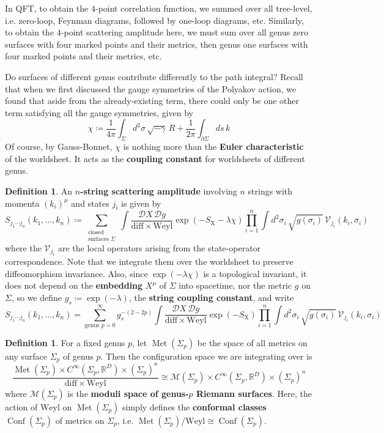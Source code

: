 \documentclass{report}
\theoremstyle{plain}
\theoremstyle{definition}
\newtheorem{definition}[theorem]{Definition}
\theoremstyle{remark}
\newcommand{\di}{\partial}
\newcommand{\bR}{\mathbb{R}}
\newcommand{\cD}{\mathcal{D}}
\newcommand{\cM}{\mathcal{M}}
\newcommand{\cV}{\mathcal{V}}
\newcommand{\diff}{\mathrm{diff}}
\newcommand{\Weyl}{\mathrm{Weyl}}
\DeclareMathOperator{\Met}{Met}
\DeclareMathOperator{\Conf}{Conf}
\begin{document}
In QFT, to obtain the $4$-point correlation function, we summed over
all tree-level, i.e. zero-loop, Feynman diagrams, followed by one-loop
diagrams, etc. Similarly, to obtain the $4$-point scattering amplitude
here, we must sum over all genus zero surfaces with four marked points
and their metrics, then genus one surfaces with four marked points and
their metrics, etc.

Do surfaces of different genus contribute differently to the path
integral? Recall that when we first discussed the gauge symmetries of
the Polyakov action, we found that aside from the already-existing
term, there could only be one other term satisfying all the
gauge symmetries, given by
\[ \chi \coloneqq \frac{1}{4\pi} \int_\Sigma d^2\sigma \, \sqrt{-\gamma} \, R + \frac{1}{2\pi} \int_{\di \Sigma} ds \, k \]
Of course, by Gauss-Bonnet, $\chi$ is nothing more than the {\bf Euler
  characteristic} of the worldsheet. It acts as the {\bf coupling
  constant} for worldsheets of different genus.

\begin{definition}
  An {\bf $n$-string scattering amplitude} involving $n$ strings with
  momenta $(k_i)^\mu$ and states $j_i$ is given by
  \[ S_{j_1 \cdots j_n}(k_1, \ldots, k_n) \coloneqq \sum_{\substack{\text{closed}\\\text{surfaces } \Sigma}} \int \frac{\cD X \, \cD g}{\diff \times \Weyl} \exp(-S_{\text{X}} - \lambda \chi) \prod_{i=1}^n \int d^2\sigma_i \, \sqrt{g(\sigma_i)} \, \cV_{j_i}(k_i, \sigma_i) \]
  where the $\cV_{j_i}$ are the local operators arising from the
  state-operator correspondence. Note that we integrate them over the
  worldsheet to preserve diffeomorphism invariance. Also, since
  $\exp(-\lambda \chi)$ is a topological invariant, it does not depend
  on the {\bf embedding} $X^\mu$ of $\Sigma$ into spacetime, nor the
  metric $g$ on $\Sigma$, so we define $g_s \coloneqq \exp(-\lambda)$,
  the {\bf string coupling constant}, and write
  \[ S_{j_1 \cdots j_n}(k_1, \ldots, k_n) = \sum_{\text{genus } p=0}^\infty g_s^{-(2-2p)} \int \frac{\cD X \, \cD g}{\diff \times \Weyl} \exp(-S_{\text{X}}) \prod_{i=1}^n \int d^2\sigma_i \, \sqrt{g(\sigma_i)} \, \cV_{j_i}(k_i, \sigma_i) \]
\end{definition}

\begin{definition}
  For a fixed genus $p$, let $\Met(\Sigma_p)$ be the space of all
  metrics on any surface $\Sigma_p$ of genus $p$. Then the
  configuration space we are integrating over is
  \[ \frac{\Met(\Sigma_p) \times C^\infty(\Sigma_p, \bR^D) \times (\Sigma_p)^n}{\diff \times \Weyl} \cong \cM(\Sigma_p) \times C^\infty(\Sigma_p, \bR^D) \times (\Sigma_p)^n \]
  where $\cM(\Sigma_p)$ is the {\bf moduli space of genus-$p$ Riemann
    surfaces}. Here, the action of $\Weyl$ on $\Met(\Sigma_p)$ simply
  defines the {\bf conformal classes} $\Conf(\Sigma_p)$ of metrics on
  $\Sigma_p$, i.e. $\Met(\Sigma_p)/\Weyl \cong \Conf(\Sigma_p)$.
\end{definition}
\end{document}
